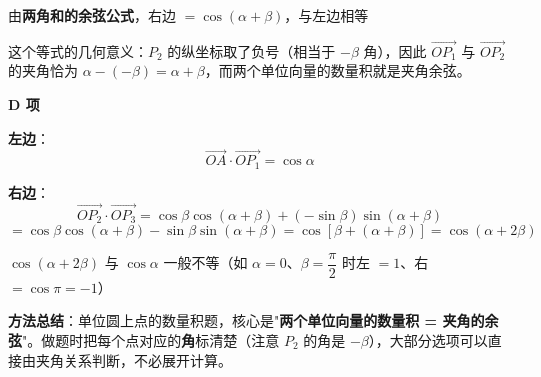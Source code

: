 \begin{answer}
由\textbf{两角和的余弦公式}，右边 $=\cos(\alpha+\beta)$，与左边相等 

\begin{gktip}
这个等式的几何意义：$P_2$ 的纵坐标取了负号（相当于 $-\beta$ 角），因此 $\overrightarrow{OP_1}$ 与 $\overrightarrow{OP_2}$ 的夹角恰为 $\alpha-(-\beta)=\alpha+\beta$，而两个单位向量的数量积就是夹角余弦。
\end{gktip}

\par\medskip

\textbf{D 项 }

\textbf{左边}：
\nopagebreak[4]
\[\overrightarrow{OA}\cdot\overrightarrow{OP_1}=\cos\alpha\]

\textbf{右边}：
\nopagebreak[4]
\[\overrightarrow{OP_2}\cdot\overrightarrow{OP_3}=\cos\beta\cos(\alpha+\beta)+(-\sin\beta)\sin(\alpha+\beta)\]
\nopagebreak[4]
\[=\cos\beta\cos(\alpha+\beta)-\sin\beta\sin(\alpha+\beta)=\cos\left[\beta+(\alpha+\beta)\right]=\cos(\alpha+2\beta)\]

$\cos(\alpha+2\beta)$ 与 $\cos\alpha$ 一般不等（如 $\alpha=0$、$\beta=\dfrac\pi2$ 时左 $=1$、右 $=\cos\pi=-1$）

\begin{gktip}
\textbf{方法总结}：单位圆上点的数量积题，核心是"\textbf{两个单位向量的数量积 = 夹角的余弦}"。做题时把每个点对应的\textbf{角}标清楚（注意 $P_2$ 的角是 $-\beta$），大部分选项可以直接由夹角关系判断，不必展开计算。
\end{gktip}


\par\medskip

\end{answer}
